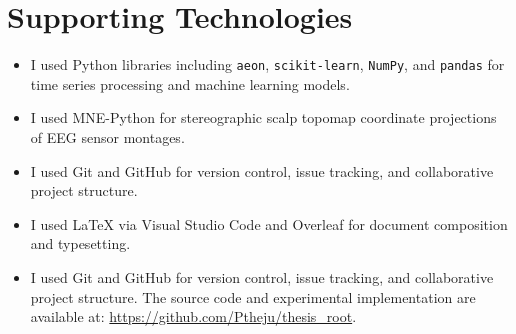 \documentclass[
  author={Praveen Kumar Vijaya Kumar},
  supervisor={Dr. Zahraa Abdallah},
  degree={MSc},
  title={Dimensionality Reduction for Multivariate Time Series},
  subtitle={Evaluating Unsupervised PCA and Supervised Filtering Paradigms},
  year={2026}
]{dissertation}
\begin{document}
\chapter*{Supporting Technologies}
\begin{itemize}
    \item I used Python libraries including \texttt{aeon}, \texttt{scikit-learn}, \texttt{NumPy}, and \texttt{pandas} for time series processing and machine learning models.
    \item I used MNE-Python for stereographic scalp topomap coordinate projections of EEG sensor montages.
    \item I used Git and GitHub for version control, issue tracking, and collaborative project structure.
    \item I used \LaTeX{} via Visual Studio Code and Overleaf for document composition and typesetting.
    \item I used Git and GitHub for version control, issue tracking, and
collaborative project structure. The source code and experimental
implementation are available at:
\url{https://github.com/Ptheju/thesis_root}.
\end{itemize}

\tableofcontents
\listoffigures
\listoftables

\mainmatter









\backmatter



\appendix

\end{document}
